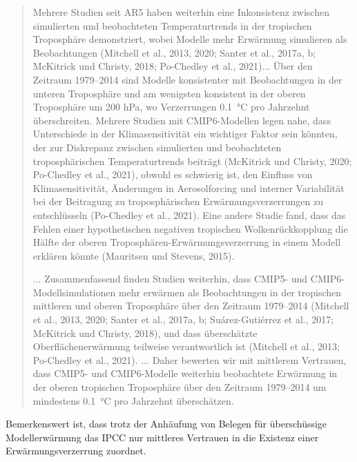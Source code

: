 \documentclass[12pt,paper=a4,DIV=12,parskip=never,chapterprefix=false,headings=standardclasses]{scrreprt}
\begin{document}
\begin{quote}
Mehrere Studien seit AR5 haben weiterhin eine Inkonsistenz zwischen simulierten und beobachteten Temperaturtrends in der tropischen Troposphäre demonstriert, wobei Modelle mehr Erwärmung simulieren als Beobachtungen (Mitchell et al., 2013, 2020; Santer et al., 2017a, b; McKitrick und Christy, 2018; Po-Chedley et al., 2021)... Über den Zeitraum 1979–2014 sind Modelle konsistenter mit Beobachtungen in der unteren Troposphäre und am wenigsten konsistent in der oberen Troposphäre um 200 hPa, wo Verzerrungen \SI{0.1}{\celsius} pro Jahrzehnt überschreiten.
Mehrere Studien mit CMIP6-Modellen legen nahe, dass Unterschiede in der Klimasensitivität ein wichtiger Faktor sein könnten, der zur Diskrepanz zwischen simulierten und beobachteten troposphärischen Temperaturtrends beiträgt (McKitrick und Christy, 2020; Po-Chedley et al., 2021), obwohl es schwierig ist, den Einfluss von Klimasensitivität, Änderungen in Aerosolforcing und interner Variabilität bei der Beitragung zu troposphärischen Erwärmungsverzerrungen zu entschlüsseln (Po-Chedley et al., 2021). Eine andere Studie fand, dass das Fehlen einer hypothetischen negativen tropischen Wolkenrückkopplung die Hälfte der oberen Troposphären-Erwärmungsverzerrung in einem Modell erklären könnte (Mauritsen und Stevens, 2015).

... Zusammenfassend finden Studien weiterhin, dass CMIP5- und CMIP6-Modell\-simulationen mehr erwärmen als Beobachtungen in der tropischen mittleren und oberen Troposphäre über den Zeitraum 1979–2014 (Mitchell et al., 2013, 2020; Santer et al., 2017a, b; Suárez-Gutiérrez et al., 2017; McKitrick und Christy, 2018), und dass überschätzte Oberflächenerwärmung teilweise verantwortlich ist (Mitchell et al., 2013; Po-Chedley et al., 2021). ... Daher bewerten wir mit mittlerem Vertrauen, dass CMIP5- und CMIP6-Modelle weiterhin beobachtete Erwärmung in der oberen tropischen Troposphäre über den Zeitraum 1979–2014 um mindestens \SI{0.1}{\celsius} pro Jahrzehnt überschätzen.
\end{quote}

Bemerkenswert ist, dass trotz der Anhäufung von Belegen für überschüssige Modellerwärmung das IPCC nur mittleres Vertrauen in die Existenz einer Erwärmungsverzerrung zuordnet.
\end{document}
